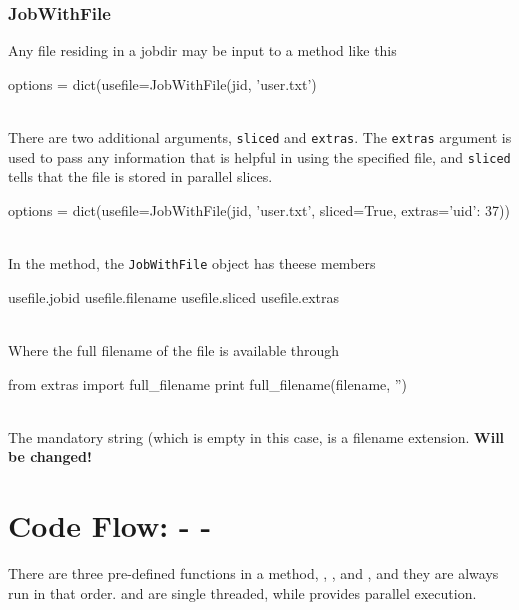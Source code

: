 \subsubsection*{JobWithFile}
Any file residing in a jobdir may be input to a method like this
\\
\begin{pythonBEG}
  options = dict(usefile=JobWithFile(jid, 'user.txt')
\end{pythonBEG}
\\
There are two additional arguments, \texttt{sliced} and
\texttt{extras}.  The \texttt{extras} argument is used to pass any
information that is helpful in using the specified file, and
\texttt{sliced} tells that the file is stored in parallel slices.
\\
\begin{pythonMID}
options = dict(usefile=JobWithFile(jid, 'user.txt', sliced=True, extras={'uid': 37}))
\end{pythonMID}
\\
In the method, the \texttt{JobWithFile} object has theese members
\\
\begin{pythonEND}
  usefile.jobid
  usefile.filename
  usefile.sliced
  usefile.extras
\end{pythonEND}
\\
Where the full filename of the file is available through
\\
\begin{python}
from extras import full_filename
print full_filename(filename, '')
\end{python}
\\
The mandatory string (which is empty in this case, is a filename
extension.  \textbf{Will be changed!}





\newpage
\section{Code Flow:  \prepare - \analysis - \synthesis}

There are three pre-defined functions in a method, \prepare,
\analysis, and \synthesis, and they are always run in that order.
\prepare and \synthesis are single threaded, while \analysis provides
parallel execution.

